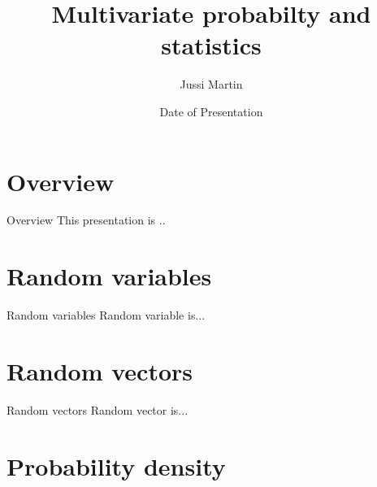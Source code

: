 \documentclass{beamer}
\title[Multivariate probabilty and statistics]{Multivariate probabilty and statistics}
\author{Jussi Martin}
\date{Date of Presentation}
\begin{document}
\begin{frame}
  \titlepage
\end{frame}


%
%
%
%
%

\section{Overview}

\begin{frame}{Overview}
  This presentation is ..
\end{frame}

\section{Random variables}

\begin{frame}{Random variables}
 Random variable is...
\end{frame}

\section{Random vectors}

\begin{frame}{Random vectors}
  Random vector is...
\end{frame}

\section{Probability density}
\end{document}
